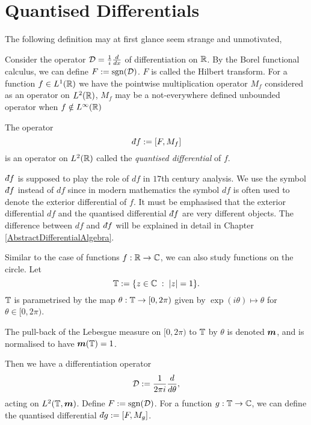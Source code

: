 \section{Quantised Differentials}
The following definition may at first glance seem strange and unmotivated,
\begin{definition}
    Consider the operator $\mathcal{D} = \frac{1}{i}\frac{d}{dx}$ of differentiation
    on $\mathbb{R}$. By the Borel functional calculus, we can define $F := \operatorname{sgn}(\mathcal{D})$. 
    $F$ is called the Hilbert transform. For a function $f \in L^1(\mathbb{R})$
    we have the pointwise multiplication
    operator $M_f$ considered as an operator on $L^2(\mathbb{R})$, $M_f$
    may be a not-everywhere defined unbounded operator when $f \notin L^\infty(\mathbb{R})$ 

    The operator
    \begin{equation}
        \qd f := [F,M_f]
    \end{equation}
    is an operator on $L^2(\mathbb{R})$
    called the \emph{quantised differential} of $f$.
\end{definition}

$\qd f$ is supposed to play the role of $df$ in $17$th century analysis. 
We use the symbol $\qd f$ instead of $df$ since in modern mathematics the symbol $df$
is often used to denote the exterior differential of $f$. It must be emphasised
that the exterior differential $df$ and the quantised differential $\qd f$ are very different objects.
The difference between $df$ and $\qd f$ will be explained in detail in Chapter \ref{AbstractDifferentialAlgebra}.


Similar to the case of functions $f:\mathbb{R}\rightarrow \mathbb{C}$, we can also
study functions on the circle. Let
\begin{equation}
    \mathbb{T} := \{z \in \mathbb{C}\;:\;|z| = 1\}.
\end{equation}
$\mathbb{T}$ is parametrised by the map $\theta:\mathbb{T}\to [0,2\pi)$
given by $\exp(i\theta) \mapsto \theta$ for $\theta \in [0,2\pi)$.

The pull-back of the Lebesgue measure on $[0,2\pi)$
to $\mathbb{T}$ by $\theta$ is denoted $\boldsymbol{m}$, and is normalised to have $\boldsymbol{m}(\mathbb{T}) = 1$. 

Then we have a differentiation operator 
\begin{equation}
    \mathcal{D} := \frac{1}{2\pi i} \frac{d}{d\theta},
\end{equation}
acting on $L^2(\mathbb{T},\boldsymbol{m})$.
Define $F := \operatorname{sgn}(\mathcal{D})$. For a function
$g:\mathbb{T}\to\mathbb{C}$, we can define the quantised
differential $\qd g := [F,M_g]$. 

